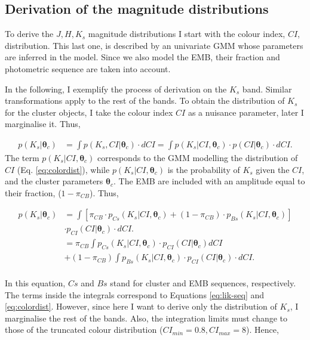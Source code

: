 \subsection{Derivation of the magnitude distributions}
\label{subsect:deriveluminosity}
To derive the $J,H,K_s$ magnitude distributions I start with the colour index, $CI$, distribution. This last one, is described by an univariate GMM whose parameters are inferred in the model. Since we also model the EMB, their fraction and photometric sequence are taken into account. 

In the following, I exemplify the process of derivation on the $K_s$ band. Similar transformations apply to the rest of the bands. 
To obtain the distribution of $K_s$ for the cluster objects, I take the colour index $CI$ as a nuisance parameter, later I marginalise it. Thus, 

\begin{align}
p(K_s | \boldsymbol{\theta}_c) & = \int p(K_s,CI | \boldsymbol{\theta}_c) \cdot dCI =  \int p(K_s | CI ,\boldsymbol{\theta}_c) \cdot p(CI|\boldsymbol{\theta}_c)\cdot dCI. \nonumber
\end{align}
The term $p(K_s | CI ,\boldsymbol{\theta}_c)$ corresponds to the GMM modelling the distribution of $CI$ (Eq. \ref{eq:colordist}), while $p(K_s | CI ,\boldsymbol{\theta}_c)$ is the probability of $K_s$ given the $CI$, and the cluster parameters $\boldsymbol{\theta}_c$. The EMB are included with an amplitude equal to their fraction, ($1-\pi_{CB}$). Thus,

\begin{align}
p(K_s | \boldsymbol{\theta}_c) & =  \int \left[\pi_{CB}\cdot p_{Cs}(K_s| CI, \boldsymbol{\theta}_c) + (1-\pi_{CB})\cdot p_{Bs}(K_s| CI, \boldsymbol{\theta}_c)\right]\nonumber \\& \cdot p_{CI}(CI|\boldsymbol{\theta}_c)\cdot dCI. \nonumber \\
& =   \pi_{CB} \int p_{Cs}(K_s| CI, \boldsymbol{\theta}_c) \cdot p_{CI}(CI|\boldsymbol{\theta}_c) dCI \nonumber \\
&+ (1-\pi_{CB})\int p_{Bs}(K_s| CI, \boldsymbol{\theta}_c) \cdot p_{CI}(CI|\boldsymbol{\theta}_c)\cdot  dCI. \nonumber \\
\end{align}

In this equation, $Cs$ and $Bs$ stand for cluster and EMB sequences, respectively. The terms inside the integrals correspond to Equations \ref{eq:lik-seq} and \ref{eq:colordist}. However, since here I want to derive only the distribution of $K_s$, I marginalise the rest of the bands. Also, the integration limits must change to those of the truncated colour distribution ($CI_{min}=0.8, CI_{max}=8$). Hence,

